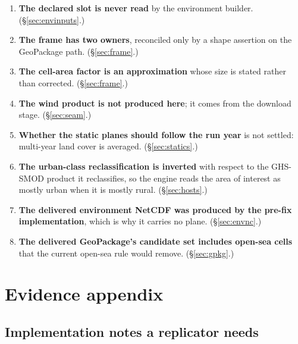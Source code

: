 \documentclass[11pt,a4paper]{article} \usepackage[utf8]{inputenc} \usepackage{lmodern} \usepackage[T1]{fontenc}
\begin{document}
\begin{enumerate}
artefact is missing. (\S\ref{sec:statics}.) 
\item \textbf{The declared  slot
is never read} by the environment builder. (\S\ref{sec:envinputs}.) 
\item \textbf{The frame has
two owners}, reconciled only by a shape assertion on the GeoPackage path. (\S\ref{sec:frame}.)
\item \textbf{The cell-area factor is an approximation} whose size is stated rather than
corrected. (\S\ref{sec:frame}.) 
\item \textbf{The wind product is not produced here}; it comes
from the download stage. (\S\ref{sec:seam}.) 
\item \textbf{Whether the static planes should
follow the run year} is not settled: multi-year land cover is averaged. (\S\ref{sec:statics}.)
\item \textbf{The urban-class reclassification is inverted} with respect to the GHS-SMOD product
it reclassifies, so the engine reads the area of interest as mostly urban when it is mostly
rural. (\S\ref{sec:hosts}.)
\item \textbf{The delivered environment NetCDF was produced by the pre-fix implementation},
which is why it carries no  plane. (\S\ref{sec:envnc}.)
\item \textbf{The delivered GeoPackage's candidate set includes open-sea cells} that the
current open-sea rule would remove. (\S\ref{sec:gpkg}.)
\end{enumerate}

\section{Evidence appendix} \label{sec:appendix}

\subsection{Implementation notes a replicator needs}
\end{document}
